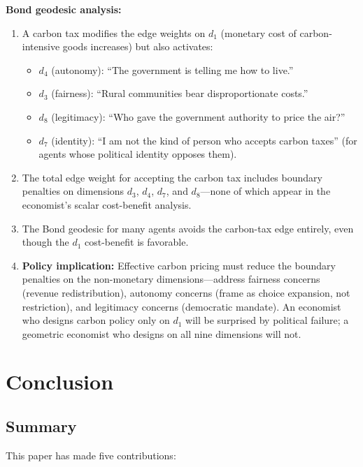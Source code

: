 \documentclass[12pt]{article}
\theoremstyle{definition}
\theoremstyle{remark}
\begin{document}
\textbf{Bond geodesic analysis:}
\begin{enumerate}
    \item A carbon tax modifies the edge weights on $d_1$ (monetary cost of carbon-intensive goods increases) but also activates:
    \begin{itemize}
        \item $d_4$ (autonomy): ``The government is telling me how to live.''
        \item $d_3$ (fairness): ``Rural communities bear disproportionate costs.''
        \item $d_8$ (legitimacy): ``Who gave the government authority to price the air?''
        \item $d_7$ (identity): ``I am not the kind of person who accepts carbon taxes'' (for agents whose political identity opposes them).
    \end{itemize}
    \item The total edge weight for accepting the carbon tax includes boundary penalties on dimensions $d_3$, $d_4$, $d_7$, and $d_8$---none of which appear in the economist's scalar cost-benefit analysis.
    \item The Bond geodesic for many agents avoids the carbon-tax edge entirely, even though the $d_1$ cost-benefit is favorable.
    \item \textbf{Policy implication:} Effective carbon pricing must reduce the boundary penalties on the non-monetary dimensions---address fairness concerns (revenue redistribution), autonomy concerns (frame as choice expansion, not restriction), and legitimacy concerns (democratic mandate).  An economist who designs carbon policy only on $d_1$ will be surprised by political failure; a geometric economist who designs on all nine dimensions will not.
\end{enumerate}


\section{Conclusion}
\label{sec:conclusion}

\subsection{Summary}

This paper has made five contributions:
\end{document}
